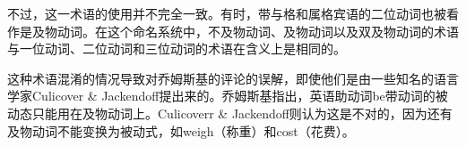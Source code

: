不过，这一术语的使用并不完全一致。有时，带与格和属格宾语的二位动词也被看作是及物动词。在这个命名系统中，不及物动词、及物动词以及双及物动词的术语与一位动词、二位动词和三位动词的术语在含义上是相同的。

这种术语混淆的情况导致对乔姆斯基的评论的误解，即使他们是由一些知名的语言学家Culicover \& Jackendoff\citeyearpar[]{CJ2005a}提出来的。乔姆斯基指出，英语助动词be带动词的被动态只能用在及物动词上。Culicoverr \& Jackendoff则认为这是不对的，因为还有及物动词不能变换为被动式，如weigh（称重）和cost（花费）。 
\eal
{}
\zl

